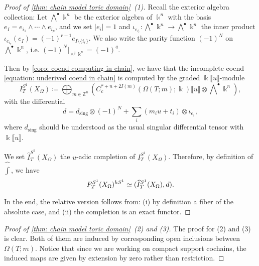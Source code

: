 \documentclass[11pt]{amsart}
\numberwithin{equation}{section}
\theoremstyle{plain}
\theoremstyle{definition}
\theoremstyle{remark}
\newcommand{\bZ} { {\mathbb{Z}}}
\newcommand{\fpw}[1]{{\llbracket #1\rrbracket}}
\begin{document}
\begin{proof}[Proof of \autoref{thm: chain model toric domain}~(1)]
Recall the exterior algebra collection: Let $\bigwedge^\bullet\Bbbk ^n$ be the exterior algebra of $\Bbbk ^n$ with the basis $e_{I}=e_{i_1}\wedge \cdots\wedge e_{i_p}$, and we set $|e_i|=1$ and $\iota_{e_{i_r}}:\bigwedge^\bullet\Bbbk ^n\to \bigwedge^\bullet\Bbbk ^n$ the inner product $\iota_{e_{i_r}}(e_{I})=(-1)^{r-1}e_{I\setminus \{i_r\}}$. We also write the parity function $(-1)^N$ on $\bigwedge^\bullet\Bbbk ^n$, i.e. $(-1)^N|_{\wedge^q\Bbbk ^n}=(-1)^q$. 

Then by \autoref{coro: coend computing in chain}, we have that the incomplete coend \autoref{equation: underived coend in chain} is computed by the graded $\Bbbk\fpw{u}$-module
\[I_{T}^{S^1}(X_\Omega)\coloneqq \bigoplus_{m\in \bZ^n}\left( C^{*+n+2I(m)}_c({ \Omega(T;m)} ;\Bbbk  )\fpw{u} \otimes \bigwedge\nolimits^\bullet \Bbbk ^n\right),\]
with the differential
\[d=d_{\mathrm{sing}}\otimes (-1)^N+\sum_i  (m_iu+t_i)\otimes \iota_{e_i},\]
where $d_{\mathrm{sing}}$ should be understood as the usual singular differential tensor with $\Bbbk\fpw{u}$. 

We set $\widehat I_T^{S^1}(X_\Omega)$ the $u$-adic completion of $I_T^{S^1}(X_\Omega)$. Therefore, by definition of $\widehat{\int} $, we have
\[F_{T}^{S^1}(X_\Omega)^{hS^1}\simeq(\widehat I_T^{S^1}(X_\Omega),d).\qedhere\]

In the end, the relative version follows from: (i) by definition a fiber of the absolute case, and (ii) the completion is an exact functor.
\end{proof}

\begin{proof}[Proof of \autoref{thm: chain model toric domain}~(2) and (3)] The proof for (2) and (3) is clear. Both of them are induced by corresponding open inclusions between $\Omega(T;m)$. Notice that since we are working on compact support cochains, the induced maps are given by extension by zero rather than restriction.
\end{proof}
\end{document}
